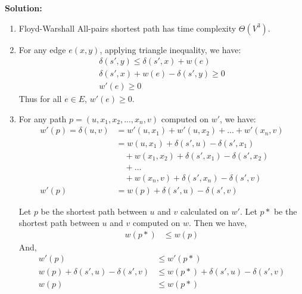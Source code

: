 \documentclass[11pt]{article}
\begin{document}
\noindent\textbf{Solution:}
\begin{enumerate}
    \item Floyd-Warshall All-pairs shortest path has time complexity $\Theta(V^3)$.
    
    \item For any edge $e(x,y)$, applying triangle inequality, we have:
        \begin{equation}\label{Q2_1}
            \begin{split}
                \delta(s',y) \leq \delta(s',x) + w(e)\\
                \delta(s',x) + w(e) - \delta(s',y) \geq 0\\
                w'(e) \geq 0
            \end{split}
        \end{equation}
        Thus for all $e\in E$, $w'(e) \geq 0$.
        
    \item For any path $p = (u,x_1, x_2,...,x_n, v)$ computed on $w'$, we have:
    \begin{equation}\label{Q2_2}
        \begin{split}
            w'(p) = \delta(u,v) &= w'(u, x_1)+w'(u, x_2)+...+w'(x_n, v)\\
                &= w(u, x_1)+\delta(s', u)-\delta(s', x_1)\\
                &\quad +w(x_1, x_2)+\delta(s', x_1)-\delta(s', x_2)\\
                &\quad +\ldots\\
                &\quad +w(x_n, v)+\delta(s', x_n)-\delta(s', v)\\
                w'(p) &= w(p)+\delta(s', u)-\delta(s', v)
        \end{split}
    \end{equation}
    
    Let $p$ be the shortest path between $u$ and $v$ calculated on $w'$. Let $p*$ be the shortest path between $u$ and $v$ computed on $w$. Then we have,
    \begin{equation}\label{Q2_3}
        \begin{split}
            w(p*) &\leq w(p)
        \end{split}
    \end{equation}
    And,
    \begin{equation}\label{Q2_4}
        \begin{split}
            w'(p) &\leq w'(p*)\\
            w(p)+\delta(s', u)-\delta(s', v) &\leq w(p*)+\delta(s', u)-\delta(s', v)\\
            w(p) &\leq w(p*)
        \end{split}
    \end{equation}
    

\end{enumerate}
\end{document}
